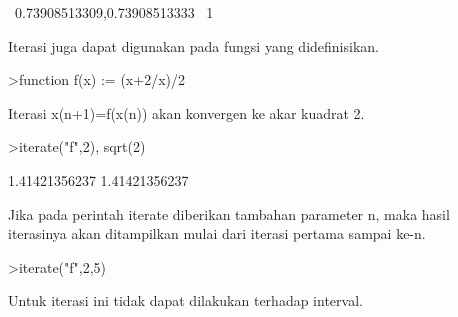\documentclass[12pt,Times new roman,letterpaper]{book}
\begin{document}
\begin{eulernootebook}
\begin{eulercomment}
\begin{eulercomment}
\begin{eulernootebook}
\begin{eulercomment}
\begin{eulercomment}
\begin{eulercomment}
\begin{eulercomment}
\begin{eulercomment}
\begin{eulercomment}
\begin{eulernotebook}
\begin{eulercomment}
\begin{eulercomment}
\begin{eulercomment}
\begin{eulercomment}
\begin{eulercomment}
\begin{eulercomment}
\begin{eulercomment}
\begin{eulercomment}
\begin{eulercomment}
\begin{eulercomment}
\begin{eulercomment}
\begin{eulercomment}
\begin{eulercomment}
\begin{eulercomment}
\begin{eulercomment}
\begin{eulercomment}
\begin{eulercomment}
\begin{eulercomment}
\begin{eulercomment}
\begin{eulercomment}
\begin{eulercomment}
\begin{eulercomment}
\begin{eulercomment}
\begin{eulercomment}
\begin{eulercomment}
\begin{eulercomment}
\begin{eulercomment}
\begin{eulercomment}
\begin{eulercomment}
\begin{eulercomment}
\begin{euleroutput}
  ~0.73908513309,0.73908513333~
  1
\end{euleroutput}
\begin{eulercomment}
Iterasi juga dapat digunakan pada fungsi yang didefinisikan.
\end{eulercomment}
\begin{eulerprompt}
>function f(x) := (x+2/x)/2
\end{eulerprompt}
\begin{eulercomment}
Iterasi x(n+1)=f(x(n)) akan konvergen ke akar kuadrat 2.
\end{eulercomment}
\begin{eulerprompt}
>iterate("f",2), sqrt(2)
\end{eulerprompt}
\begin{euleroutput}
  1.41421356237
  1.41421356237
\end{euleroutput}
\begin{eulercomment}
Jika pada perintah iterate diberikan tambahan parameter n, maka hasil
iterasinya akan ditampilkan mulai dari iterasi pertama sampai ke-n.
\end{eulercomment}
\begin{eulerprompt}
>iterate("f",2,5)
\end{eulerprompt}
\begin{euleroutput}
  [2,  1.5,  1.41667,  1.41422,  1.41421,  1.41421]
\end{euleroutput}
\begin{eulercomment}
Untuk iterasi ini tidak dapat dilakukan terhadap interval.
\end{eulercomment}

\end{eulercomment}
\end{eulercomment}
\end{eulercomment}
\end{eulercomment}
\end{eulercomment}
\end{eulercomment}
\end{eulercomment}
\end{eulercomment}
\end{eulercomment}
\end{eulercomment}
\end{eulercomment}
\end{eulercomment}
\end{eulercomment}
\end{eulercomment}
\end{eulercomment}
\end{eulercomment}
\end{eulercomment}
\end{eulercomment}
\end{eulercomment}
\end{eulercomment}
\end{eulercomment}
\end{eulercomment}
\end{eulercomment}
\end{eulercomment}
\end{eulercomment}
\end{eulercomment}
\end{eulercomment}
\end{eulercomment}
\end{eulercomment}
\end{eulercomment}
\end{eulernotebook}
\end{eulercomment}
\end{eulercomment}
\end{eulercomment}
\end{eulercomment}
\end{eulercomment}
\end{eulercomment}
\end{eulernootebook}
\end{eulercomment}
\end{eulercomment}
\end{eulernootebook}
\end{document}
